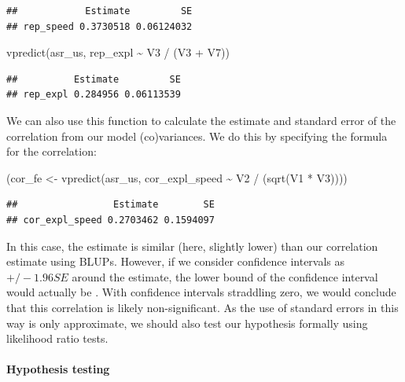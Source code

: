 \documentclass[
  12pt,
]{book}
\newenvironment{Shaded}{\begin{snugshade}}{\end{snugshade}}
\newcommand{\FunctionTok}[1]{\textcolor[rgb]{0.00,0.00,0.00}{#1}}
\newcommand{\NormalTok}[1]{#1}
\newcommand{\OtherTok}[1]{\textcolor[rgb]{0.56,0.35,0.01}{#1}}
\newcommand{\SpecialCharTok}[1]{\textcolor[rgb]{0.00,0.00,0.00}{#1}}
\begin{document}
\begin{verbatim}
##            Estimate         SE
## rep_speed 0.3730518 0.06124032
\end{verbatim}

\begin{Shaded}
\begin{Highlighting}[]
\FunctionTok{vpredict}\NormalTok{(asr\_us, rep\_expl }\SpecialCharTok{\textasciitilde{}}\NormalTok{ V3 }\SpecialCharTok{/}\NormalTok{ (V3 }\SpecialCharTok{+}\NormalTok{ V7))}
\end{Highlighting}
\end{Shaded}

\begin{verbatim}
##          Estimate         SE
## rep_expl 0.284956 0.06113539
\end{verbatim}

We can also use this function to calculate the estimate and standard error of the correlation from our model (co)variances. We do this by specifying the formula for the correlation:

\begin{Shaded}
\begin{Highlighting}[]
\NormalTok{(cor\_fe }\OtherTok{\textless{}{-}} \FunctionTok{vpredict}\NormalTok{(asr\_us, cor\_expl\_speed }\SpecialCharTok{\textasciitilde{}}\NormalTok{ V2 }\SpecialCharTok{/}\NormalTok{ (}\FunctionTok{sqrt}\NormalTok{(V1 }\SpecialCharTok{*}\NormalTok{ V3))))}
\end{Highlighting}
\end{Shaded}

\begin{verbatim}
##                 Estimate        SE
## cor_expl_speed 0.2703462 0.1594097
\end{verbatim}

In this case, the estimate is similar (here, slightly lower) than our correlation estimate using BLUPs.
However, if we consider confidence intervals as \(+/- 1.96SE\) around the estimate, the lower bound of the confidence interval would actually be .
With confidence intervals straddling zero, we would conclude that this correlation is likely non-significant.
As the use of standard errors in this way is only approximate, we should also test our hypothesis formally using likelihood ratio tests.

\hypertarget{hypothesis-testing}{%
\paragraph{Hypothesis testing}\label{hypothesis-testing}}
\end{document}
